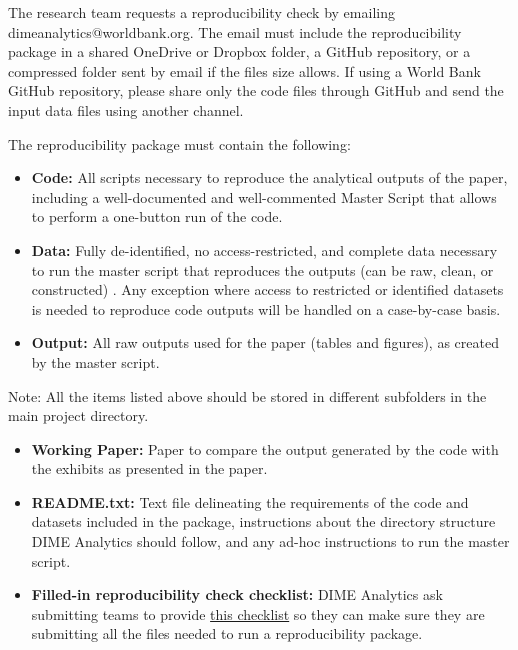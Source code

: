 \begin{fullwidth}
	The research team requests a reproducibility check by emailing dimeanalytics@worldbank.org. The email must include the reproducibility package in a shared OneDrive or Dropbox folder, a GitHub repository, or a compressed folder sent by email if the files size allows. If using a World Bank GitHub repository, please share only the code files through GitHub and send the input data files using another channel. 
	
	The reproducibility package must contain the following:

	\bigskip

	\begin{itemize}
		\setlength\itemsep{-0.1em}
		\item \textbf{Code:} All scripts necessary to reproduce the analytical outputs of the paper, including a well-documented and well-commented Master Script that allows to perform a one-button run of the code.
		\item \textbf{Data:} Fully de-identified, no access-restricted, and complete data necessary to run the master script that reproduces the outputs (can be raw, clean, or constructed) . Any exception where access to restricted or identified datasets is needed to reproduce code outputs will be handled on a case-by-case basis.
		\item \textbf{Output:} All raw outputs used for the paper (tables and figures), as created by the master script.
	\end{itemize}

	\bigskip

	Note: All the items listed above should be stored in different subfolders in the main project directory.

	\bigskip

	\begin{itemize}
		\setlength\itemsep{-0.1em}
		\item \textbf{Working Paper:} Paper to compare the output generated by the code with the exhibits as presented in the paper.
		\item \textbf{README.txt:} Text file delineating the requirements of the code and datasets included in the package, instructions about the directory structure DIME Analytics should follow, and any ad-hoc instructions to run the master script.
		\item \textbf{Filled-in reproducibility check checklist:} DIME Analytics ask submitting teams to provide \href{https://raw.githubusercontent.com/worldbank/dime-standards/master/dime-research-standards/pillar-3-research-reproducibility/checklists/Reproducibility%20package%20submission%20checklist.pdf}{this checklist} so they can make sure they are submitting all the files needed to run a reproducibility package.
	\end{itemize}


\end{fullwidth}

